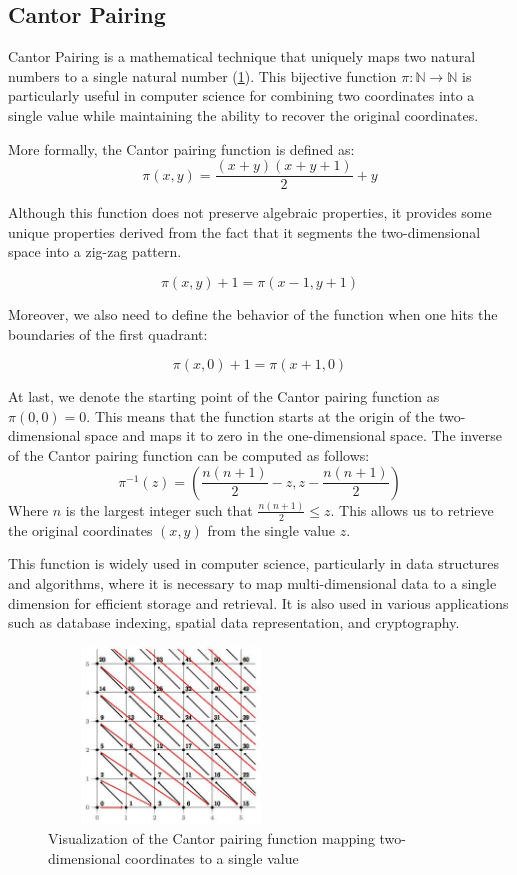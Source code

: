 \subsection{Cantor Pairing}

Cantor Pairing is a mathematical technique that uniquely maps two natural numbers to a single natural number (\cref{fig:cantor}). This bijective function $\pi: \mathbb{N} \to \mathbb{N}$ is particularly useful in computer science for combining two coordinates into a single value while maintaining the ability to recover the original coordinates.

More formally, the Cantor pairing function is defined as:
\[
    \pi(x, y) = \frac{(x + y)(x + y + 1)}{2} + y
\]

Although this function does not preserve algebraic properties, it provides some unique properties derived from the fact that it segments the two-dimensional space into a zig-zag pattern.

\[
    \pi(x, y) + 1 = \pi(x - 1, y + 1)
\]

Moreover, we also need to define the behavior of the function when one hits the boundaries of the first quadrant:

\[
    \pi(x, 0) + 1 = \pi(x + 1, 0)
\]

At last, we denote the starting point of the Cantor pairing function as \( \pi(0, 0) = 0 \). This means that the function starts at the origin of the two-dimensional space and maps it to zero in the one-dimensional space. The inverse of the Cantor pairing function can be computed as follows:
\[
    \pi^{-1}(z) = \left( \frac{n(n + 1)}{2} - z, z - \frac{n(n + 1)}{2} \right)
\]
Where \( n \) is the largest integer such that \( \frac{n(n + 1)}{2} \leq z \). This allows us to retrieve the original coordinates \( (x, y) \) from the single value \( z \).

This function is widely used in computer science, particularly in data structures and algorithms, where it is necessary to map multi-dimensional data to a single dimension for efficient storage and retrieval. It is also used in various applications such as database indexing, spatial data representation, and cryptography.


\vspace{5mm}

\begin{figure}[h]
    \centering
    \includegraphics[width=6.5cm,height=4.7cm]{img/cantor-pairing.jpg}
    \caption{Visualization of the Cantor pairing function mapping two-dimensional coordinates to a single value}
    \label{fig:cantor}
\end{figure}

